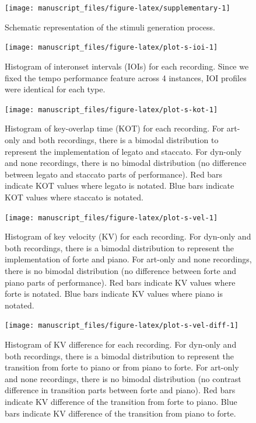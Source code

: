 \documentclass[
  man,floatsintext]{apa6}
\begin{document}
\begin{figure}
\texttt{[image: manuscript\_files/figure-latex/supplementary-1]} \caption{\label{fig:supplementary}Schematic representation of the stimuli generation process.}\label{fig:supplementary}
\end{figure}

\begin{figure}
\texttt{[image: manuscript\_files/figure-latex/plot-s-ioi-1]} \caption{\label{fig:s-ioi}Histogram of interonset intervals (IOIs) for each recording. Since we fixed the tempo performance feature across 4 instances, IOI profiles were identical for each type.}\label{fig:plot-s-ioi}
\end{figure}

\begin{figure}
\texttt{[image: manuscript\_files/figure-latex/plot-s-kot-1]} \caption{\label{fig:s-kot}Histogram of key-overlap time (KOT) for each recording. For art-only and both recordings, there is a bimodal distribution to represent the implementation of legato and staccato. For dyn-only and none recordings, there is no bimodal distribution (no difference between legato and staccato parts of performance). Red bars indicate KOT values where legato is notated. Blue bars indicate KOT values where staccato is notated.}\label{fig:plot-s-kot}
\end{figure}

\begin{figure}
\texttt{[image: manuscript\_files/figure-latex/plot-s-vel-1]} \caption{\label{fig:s-vel}Histogram of key velocity (KV) for each recording. For dyn-only and both recordings, there is a bimodal distribution to represent the implementation of forte and piano. For art-only and none recordings, there is no bimodal distribution (no difference between forte and piano parts of performance). Red bars indicate KV values where forte is notated. Blue bars indicate KV values where piano is notated.}\label{fig:plot-s-vel}
\end{figure}

\begin{figure}
\texttt{[image: manuscript\_files/figure-latex/plot-s-vel-diff-1]} \caption{\label{fig:s-vel-diff}Histogram of KV difference for each recording. For dyn-only and both recordings, there is a bimodal distribution to represent the transition from forte to piano or from piano to forte. For art-only and none recordings, there is no bimodal distribution (no contrast difference in transition parts between forte and piano). Red bars indicate KV difference of the transition from forte to piano. Blue bars indicate KV difference of the transition from piano to forte.}\label{fig:plot-s-vel-diff}
\end{figure}
\end{document}
